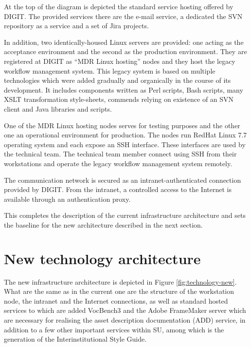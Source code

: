 	At the top of the diagram is depicted the standard service hosting offered by DIGIT. The provided services there are the e-mail service, a dedicated the SVN repository as a service and a set of Jira projects.
	
	In addition, two identically-housed Linux servers are provided: one acting as the acceptance environment and the second as the production environment. They are registered at DIGIT as ``MDR Linux hosting'' nodes and they host the legacy workflow management system. This legacy system is based on multiple technologies which were added gradually and organically in the course of its development. It includes components written as Perl scripts, Bash scripts, many XSLT transformation style-sheets, commends relying on existence of an SVN client and Java libraries and scripts.
		
	One of the MDR Linux hosting nodes serves for testing purposes and the other one an operational environment for production. The nodes run RedHat Linux 7.7 operating system and each expose an SSH interface. These interfaces are used by the technical team. The technical team member connect using SSH from their workstations and operate the legacy workflow management system remotely.
	
	The communication network is secured as an intranet-authenticated connection provided by DIGIT. From the intranet, a controlled access to the Internet is available through an authentication proxy. 
	
	This completes the description of the current infrastructure architecture and sets the baseline for the new architecture described in the next section.
	
	\section{New technology architecture}
	\label{sec:technology-new}
	
	The new infrastructure architecture is depicted in Figure \ref{fig:technology-new}. What are the same as in the current one are the structure of the workstation node, the intranet and the Internet connections, as well as standard hosted services to which are added VocBench3 and the Adobe FrameMaker server which are necessary for realising the asset description documentation (ADD) service, in addition to a few other important services within SU, among which is the generation of the Interinstitutional Style Guide. 
	
